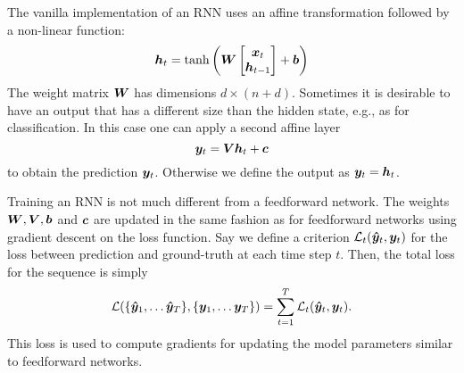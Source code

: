 		The vanilla implementation of an RNN uses an affine transformation followed by a non-linear function:
		\begin{equation}\label{eq:vanilla_RNN}
			\bm{h}_t = 
			\tanh \left(
			\bm{W}
			\begin{bmatrix}
				\bm{x}_t \\
				\bm{h}_{t-1}
			\end{bmatrix}
			+ \bm{b}
			\right)
		\end{equation}
		The weight matrix $\bm{W}$ has dimensions $d \times (n + d)$.
		Sometimes it is desirable to have an output that has a different size than the hidden state, e.g., as for classification.
		In this case one can apply a second affine layer
		\begin{equation}
			\bm{y}_t = \bm{V} \bm{h}_t + \bm{c}
		\end{equation}
		to obtain the prediction $\bm{y}_t$.
		Otherwise we define the output as $\bm{y}_t = \bm{h}_t$.
		
		Training an RNN is not much different from a feedforward network.
		The weights $\bm{W}, \bm{V}, \bm{b}$ and $\bm{c}$ are updated in the same fashion as for feedforward networks using gradient descent on the loss function.
		Say we define a criterion $\mathcal{L}_t(\bm{\hat{y}}_t, \bm{y}_t)$ for the loss between prediction and ground-truth at each time step $t$.
		Then, the total loss for the sequence is simply 
		\begin{equation}\label{eq:loss_for_rnn}
			\mathcal{L}(\{\vectr{\hat{y}}_1, \dots \vectr{\hat{y}}_T\}, \{\vectr{y}_1, \dots \vectr{y}_T\}) = 
			\sum_{t=1}^{T} \mathcal{L}_t(\vectr{\hat{y}}_t, \vectr{y}_t).
		\end{equation}
		This loss is used to compute gradients for updating the model parameters similar to feedforward networks.
		
